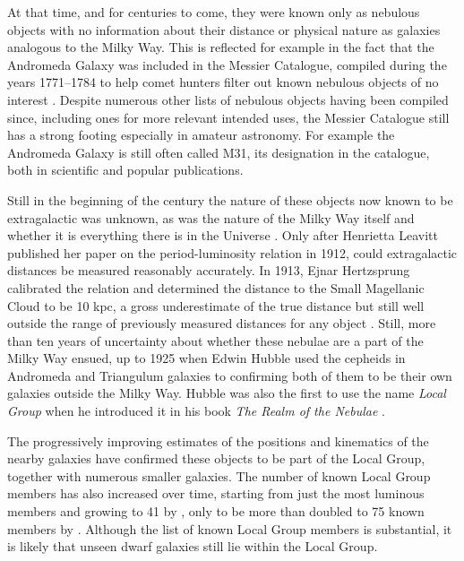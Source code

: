 \documentclass[english, twoside]{HYgradu}
\begin{document}
At that time, and for centuries to come, they were known only as nebulous objects with no information about their distance or physical nature as galaxies analogous to the Milky Way. This is reflected for example in the fact that the Andromeda Galaxy was included in the Messier Catalogue, compiled during the years 1771--1784 to help comet hunters filter out known nebulous objects of no interest \citep{longair2006cosmic}. Despite numerous other lists of nebulous objects having been compiled since, including ones for more relevant intended uses, the Messier Catalogue still has a strong footing especially in amateur astronomy. For example the Andromeda Galaxy is still often called M31, its designation in the catalogue, both in scientific and popular publications.

Still in the beginning of the  century the nature of these objects now known to be extragalactic was unknown, as was the nature of the Milky Way itself and whether it is everything there is in the Universe \citep{longair2006cosmic}. Only after Henrietta Leavitt published her paper on the period-luminosity relation in 1912, could extragalactic distances be measured reasonably accurately. In 1913, Ejnar Hertzsprung calibrated the relation and determined the distance to the Small Magellanic Cloud to be 10 kpc, a gross underestimate of the true distance but still well outside the range of previously measured distances for any object \citep{longair2006cosmic}. Still, more than ten years of uncertainty about whether these nebulae are a part of the Milky Way ensued, up to 1925 when Edwin Hubble used the cepheids in Andromeda and Triangulum galaxies to confirming both of them to be their own galaxies outside the Milky Way. Hubble was also the first to use the name \textit{Local Group} when he introduced it in his book \textit{The Realm of the Nebulae} \citep{hubble1936realm}.

The progressively improving estimates of the positions and kinematics of the nearby galaxies have confirmed these objects to be part of the Local Group, together with numerous smaller galaxies. The number of known Local Group members has also increased over time, starting from just the most luminous members and growing to 41 by \citeyear{mateo1998dwarf}, only to be more than doubled to 75 known members by \citeyear{mcconnachie2012observed} \citep{mateo1998dwarf, mcconnachie2012observed}. Although the list of known Local Group members is substantial, it is likely that unseen dwarf galaxies still lie within the Local Group.
\end{document}
